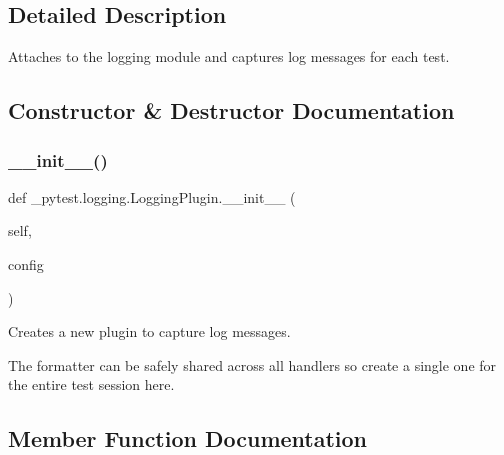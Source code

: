 \subsection{Detailed Description}
\begin{DoxyVerb}Attaches to the logging module and captures log messages for each test.
\end{DoxyVerb}
 

\subsection{Constructor \& Destructor Documentation}
\mbox{\label{class__pytest_1_1logging_1_1_logging_plugin_a4c26345ad1cfaeb2a7cff71e3fda6f8e}} 
\subsubsection{\texorpdfstring{\+\_\+\+\_\+init\+\_\+\+\_\+()}{\_\_init\_\_()}}
{\footnotesize\ttfamily def \+\_\+pytest.\+logging.\+Logging\+Plugin.\+\_\+\+\_\+init\+\_\+\+\_\+ (\begin{DoxyParamCaption}\item[{}]{self,  }\item[{}]{config }\end{DoxyParamCaption})}

\begin{DoxyVerb}Creates a new plugin to capture log messages.

The formatter can be safely shared across all handlers so
create a single one for the entire test session here.
\end{DoxyVerb}
 

\subsection{Member Function Documentation}
\mbox{\label{class__pytest_1_1logging_1_1_logging_plugin_aa8eeb7ee732f1ba9dccf1d1551448044}} 
